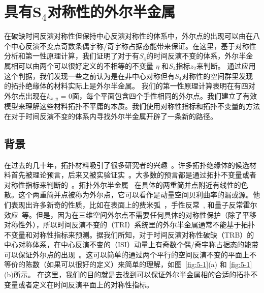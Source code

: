 \chapter{具有{S$_4$}对称性的外尔半金属}\label{chap:s4}

在破缺时间反演对称性但保持中心反演对称性的体系中，外尔点的出现可以由在八个中心反演不变点奇数条偶宇称/奇宇称占据态能带来保证。在这里，基于对称性分析和第一性原理计算，我们证明了对于有$S_4$的时间反演不变的体系，外尔半金属相可以由两个可以很好定义的不相等的不变量 $\eta$ 和$S_4$指标$z_2$来判断。
通过应用这个判据，我们发现一些之前认为是在非中心对称但有$S_4$对称性的空间群里发现的拓扑绝缘体的材料实际上是外尔半金属。
我们的第一性原理计算表明在有四对外尔点出现在$k_{x,y}$ = 0面，每个平面包含四个手性相同的外尔点。我们建立了有效模型来理解这些材料拓扑不平庸的本质。我们使用对称性指标和拓扑不变量的方法在对于时间反演不变的体系内寻找外尔半金属开辟了一条新的路径。 

\section{背景}
在过去的几十年，拓扑材料吸引了很多研究者的兴趣~\citep{bernevig2006quantum,zhang2009topological,Qi2010The,TIreview, Wan2011,wang2013three,Weng2016Topological,wang2016hourglass,PRBwzj,pre96wang,tqc2017,RevModPhys.90.015001,prb97wang}。许多拓扑绝缘体的候选材料首先被理论预言，后来又被实验证实~\citep{bernevig2006quantum, konig2007quantum, zhang2009topological, chen2009experimental, advwang}。大多数的预言都是通过拓扑不变量或者对称性指标来判断的~\citep{Fu2007topo, Fu2007IS,Slager2017, haruki2018, song2017, Vergniory2019, Zhang2018, wanxg2019}。拓扑外尔半金属~\citep{Murakami_2007,Liu2014Weyl,weng2015weyl,soluyanov2015type,lv2015observation,lv2015experimental,Weng2016Coexistence,PhysRevLett.117.236401,nie2017topological,sakai2018,prb99} 在具体的两重简并点附近有线性的色散。这个两重简并点被称为外尔点，它可以看作是动量空间贝利曲率的漏或源。他们表现出许多新奇的性质，比如在表面上的费米弧~\citep{Wan2011,xu2015discovery,xu2016observation,wang2016observation2}，手性反常~\citep{huang2015observation,zhang2016signatures}, 和量子反常霍尔效应~\citep{Fang92,xu2011chern}等。但是，因为在三维空间外尔点不需要任何具体的对称性保护（除了平移对称性外），所以时间反演不变的（TRI）系统里的外尔半金属通常不能基于拓扑不变量和对称性指标来预测。据我们所知，对于时间反演对称性破缺（TRB）的中心对称体系，在中心反演不变的（ISI）动量上有奇数个偶/奇宇称占据态的能带可以保证外尔点的出现~\citep{Hughes2010Inversion,PhysRevLett.117.236401,nie2019magnetic}。这可以简单的通过两个平行的空间反演不变的平面上不等价的陈数（如果可以很好的定义）来简单的理解，如图~\ref{fig:5-1}(a) 和 \ref{fig:5-1}(b)所示。 在这里，我们的目的就是去找到可以保证外尔半金属相的合适的拓扑不变量或者定义在时间反演平面上的对称性指标。

